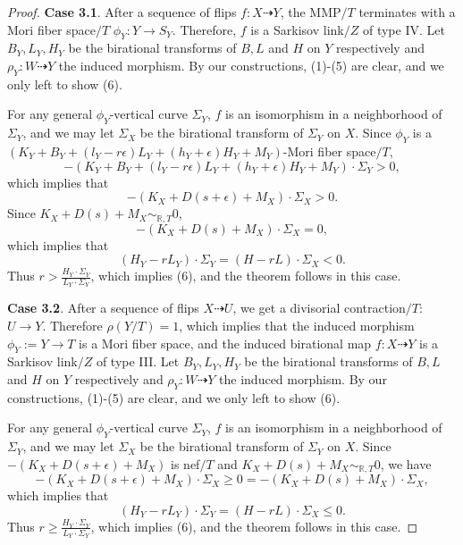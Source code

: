 \documentclass[11pt]{amsart}
\numberwithin{equation}{section}
\newcommand{\Rr}{\mathbb{R}}
\theoremstyle{definition}
\theoremstyle{definition}
\theoremstyle{definition}
\begin{document}
\begin{proof}
\medskip


\noindent\textbf{Case 3.1}. After a sequence of flips $f: X\dashrightarrow Y$, the MMP$/T$ terminates with a Mori fiber space$/T$ $\phi_Y: Y\rightarrow S_Y$. Therefore, $f$ is a Sarkisov link$/Z$ of type IV.  Let $B_Y,L_Y,H_Y$ be the birational transforms of $B,L$ and $H$ on $Y$ respectively and $\rho_Y: W\dashrightarrow Y$ the induced morphism. By our constructions, (1)-(5) are clear, and we only left to show (6).

For any general $\phi_Y$-vertical curve $\Sigma_Y$, $f$ is an isomorphism in a neighborhood of $\Sigma_Y$, and we may let $\Sigma_X$ be the birational transform of $\Sigma_Y$ on $X$. Since $\phi_Y$ is a $(K_Y+B_Y+(l_Y-r\epsilon)L_Y+(h_Y+\epsilon)H_Y+M_Y)$-Mori fiber space$/T$, 
$$-(K_Y+B_Y+(l_Y-r\epsilon)L_Y+(h_Y+\epsilon)H_Y+M_Y)\cdot\Sigma_Y>0,$$
which implies that
$$-(K_X+D(s+\epsilon)+M_X)\cdot\Sigma_X>0.$$
Since $K_X+D(s)+M_X\sim_{\Rr,T}0$, 
$$-(K_X+D(s)+M_X)\cdot\Sigma_X=0,$$
which implies that 
$$(H_Y-rL_Y)\cdot\Sigma_Y=(H-rL)\cdot\Sigma_X<0.$$ 
Thus $r>\frac{H_Y\cdot\Sigma_Y}{L_Y\cdot\Sigma_Y}$, which implies (6), and the theorem follows in this case.

\medskip

\noindent\textbf{Case 3.2}. After a sequence of flips $X\dashrightarrow U$, we get a divisorial contraction$/T$: $U\rightarrow Y$. Therefore $\rho(Y/T)=1$, which implies that the induced morphism $\phi_Y:=Y\rightarrow T$ is a Mori fiber space, and the induced birational map $f: X\dashrightarrow Y$ is a Sarkisov link$/Z$ of type III. Let $B_Y,L_Y,H_Y$ be the birational transforms of $B,L$ and $H$ on $Y$ respectively and $\rho_Y: W\dashrightarrow Y$ the induced morphism. By our constructions, (1)-(5) are clear, and we only left to show (6).

For any general $\phi_Y$-vertical curve $\Sigma_Y$, $f$ is an isomorphism in a neighborhood of $\Sigma_Y$, and we may let $\Sigma_X$ be the birational transform of $\Sigma_Y$ on $X$. Since $-(K_X+D(s+\epsilon)+M_X)$ is nef$/T$ and $K_X+D(s)+M_X\sim_{\Rr,T}0$, we have
$$-(K_X+D(s+\epsilon)+M_X)\cdot\Sigma_X\geq 0=-(K_X+D(s)+M_X)\cdot\Sigma_X,$$
which implies that 
$$(H_Y-rL_Y)\cdot\Sigma_Y=(H-rL)\cdot\Sigma_X\leq 0.$$ 
Thus $r\geq\frac{H_Y\cdot\Sigma_Y}{L_Y\cdot\Sigma_Y}$, which implies (6), and the theorem follows in this case.

\medskip


\end{proof}
\end{document}
